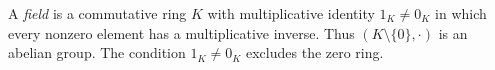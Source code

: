 
A \emph{field} is a commutative ring $K$ with multiplicative identity $1_K\ne0_K$ in which every nonzero element has a multiplicative inverse. Thus $(K\setminus\{0\},\cdot)$ is an abelian group. The condition $1_K\ne0_K$ excludes the zero ring.
